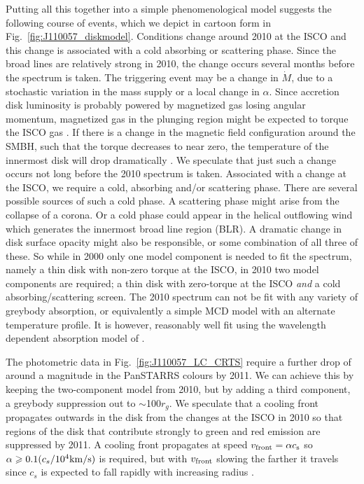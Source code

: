 \documentclass[a4paper,fleqn,usenatbib]{mnras}
\begin{document}
Putting all this together into a simple phenomenological model
suggests the following course of events, which we depict in cartoon
form in Fig.~\ref{fig:J110057_diskmodel}.  Conditions change around
2010 at the ISCO and this change is associated with a cold absorbing
or scattering phase. Since the broad lines are relatively strong in
2010, the change occurs several months before the spectrum is
taken. The triggering event may be a change in $\dot{M}$, due to a
stochastic variation in the mass supply or a local change in
$\alpha$. Since accretion disk luminosity is probably powered by
magnetized gas losing angular momentum, magnetized gas in the plunging
region might be expected to torque the ISCO gas \citep[e.g.,
][]{Gammie1999, Agol_Krolik2000}. If there is a change in the magnetic
field configuration around the SMBH, such that the torque decreases to
near zero, the temperature of the innermost disk will drop
dramatically \citep{Cao2003}.  We speculate that just such a change
occurs not long before the 2010 spectrum is taken. Associated with a
change at the ISCO, we require a cold, absorbing and/or scattering
phase. There are several possible sources of such a cold phase. A
scattering phase might arise from the collapse of a corona. Or a cold
phase could appear in the helical outflowing wind which generates the
innermost broad line region (BLR). A dramatic change in disk surface
opacity might also be responsible, or some combination of all three of
these. So while in 2000 only one model component is needed to fit the
spectrum, namely a thin disk with non-zero torque at the ISCO, in 2010
two model components are required; a thin disk with zero-torque at the
ISCO \emph{and} a cold absorbing/scattering screen. The 2010 spectrum
can not be fit with any variety of greybody absorption, or
equivalently a simple MCD model with an alternate temperature
profile. It is however, reasonably well fit using the wavelength
dependent absorption model of \citep{Guo2016}.

The photometric data in Fig.~\ref{fig:J110057_LC_CRTS} require a
further drop of around a magnitude in the PanSTARRS colours by
2011. We can achieve this by keeping the two-component model from
2010, but by adding a third component, a greybody suppression out to
$\sim$100$r_{g}$. We speculate that a cooling front propagates outwards
in the disk from the changes at the ISCO in 2010 so that regions of
the disk that contribute strongly to green and red emission are
suppressed by 2011. A cooling front propagates at speed $v_{\rm
front}=\alpha c_{\rm s}$ \citep{Hameury2009} so $\alpha \geq
0.1(c_{s}/10^{4}{\rm km/s})$ is required, but with $v_{\rm front}$
slowing the farther it travels since $c_{s}$ is expected to fall
rapidly with increasing radius \citep{Sirko_Goodman2003}.
\end{document}

